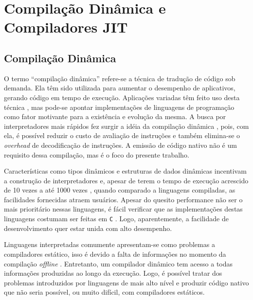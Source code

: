 \chapter{Compilação Dinâmica e Compiladores JIT}
\label{compdyn}

\section{Compilação Dinâmica}

O termo ``compilação dinâmica'' refere-se a técnica de tradução de
código sob demanda. Ela têm sido utilizada para aumentar o desempenho
de aplicativos, gerando código em tempo de execução. Aplicações
variadas têm feito uso desta técnica \cite{holzle}, mas pode-se apontar
implementações de linguagens de programação como fator motivante para
a existência e evolução da mesma. A busca por
interpretadores mais rápidos fez surgir a idéia da compilação dinâmica
\cite{holzle}, pois, com ela, é possível reduzir o custo de avaliação de
instruções e também elimina-se o \textit{overhead} de decodificação de
instruções.
A emissão de código nativo não é um requisito dessa compilação, mas é
o foco do presente trabalho.

Características como tipos dinâmicos e estruturas de dados dinâmicas
incentivam a construção de interpretadores
\cite{trustworthycompilers} e, apesar de terem o tempo de execução
acrescido de 10 vezes \cite{plezbert} a até 1000 vezes
\cite{trustworthycompilers}, quando comparado a linguagens compiladas, as
facilidades fornecidas atraem usuários. Apesar do quesito performance
não ser o mais prioritário nessas linguagens, é fácil verificar que as
implementações destas linguagens costumam ser feitas em \texttt{C}
\cite{dyla1}. Logo,
aparentemente, a facilidade de desenvolvimento quer estar unida com
alto desempenho.

Linguagens interpretadas comumente apresentam-se como problemas a
compiladores estático, isso é devido a falta de informações no momento
da compilação \textit{offline} \cite{holzle}.
Entretanto, um compilador dinâmico tem acesso a todas informações
produzidas ao longo da execução.
Logo, é possível tratar dos problemas
introduzidos por linguagens de mais alto nível e produzir código
nativo que não seria possível, ou muito difícil, com compiladores
estáticos.


